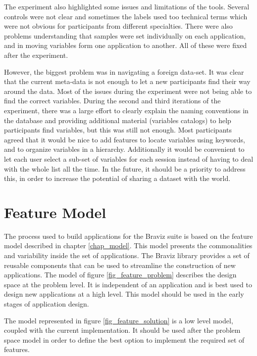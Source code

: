 The experiment also highlighted some issues and limitations of the tools. Several controls were not clear and sometimes the labels used too technical terms which were not obvious for participants from different specialties. There were also problems understanding that samples were set individually on each application, and in moving variables form one application to another. All of these were fixed after the experiment. 

However, the biggest problem was in navigating a foreign data-set. It was clear that the current meta-data is not enough to let a new participants find their way around the data. Most of the issues during the experiment were not being able to find the correct variables. During the second and third iterations of the experiment, there was a large effort to clearly explain the naming conventions in the database and providing additional material (variables catalogs) to help participants find variables, but this was still not enough. Most participants agreed that it would be nice to add features to locate variables using keywords, and to organize variables in a hierarchy. Additionally it would be convenient to let each user select a sub-set of variables for each session instead of having to deal with the whole list all the time. In the future, it should be a priority to address this, in order to increase the potential of sharing a dataset with the world.


\section{Feature Model}


The process used to build applications for the Braviz suite is based on the feature model described in chapter \ref{chap_model}. This model presents the commonalities and variability inside the set of applications. The Braviz library provides a set of reusable components that can be used to streamline the construction of new applications. The model of figure \ref{fig_feature_problem} describes the design space at the problem level. It is independent of an application and is best used to design new applications at a high level. This model should be used in the early stages of application design. 

The model represented in figure \ref{fig_feature_solution} is a low level model, coupled with the current implementation. It should be used after the problem space model in order to define the best option to implement the required set of features. 

